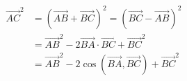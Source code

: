 \documentclass[preview]{standalone}
\begin{document}
\begin{align*}
\overrightarrow{AC}^2 &= (\overrightarrow{AB} + \overrightarrow{BC})^2 =(\overrightarrow{BC} - \overrightarrow{AB})^2\\&= \overrightarrow{AB}^2 - 2\overrightarrow{BA}\cdot\overrightarrow{BC} + \overrightarrow{BC}^2\\&= \overrightarrow{AB}^2 -2\cos\left(\overrightarrow{BA},\overrightarrow{BC}\right)+ \overrightarrow{BC}^2\\
\end{align*}
\end{document}
